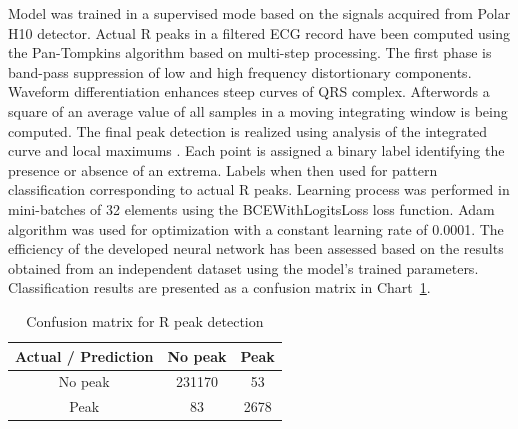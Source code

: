 \documentclass[journal]{IEEEtran}
\begin{document}
Model was trained in a supervised mode based on the signals acquired from Polar H10 detector. Actual R peaks in a filtered ECG record have been computed using the Pan-Tompkins algorithm based on multi-step processing. The first phase is band-pass suppression of low and high frequency distortionary components. Waveform differentiation enhances steep curves of QRS complex. Afterwords a square of an average value of all samples in a moving integrating window is being computed. The final peak detection is realized using analysis of the integrated curve and local maximums \cite{27}.
Each point is assigned a binary label identifying the presence or absence of an extrema. Labels when then used for pattern classification corresponding to actual R peaks.
\newpage
Learning process was performed in mini-batches of 32 elements using the BCEWithLogitsLoss loss function. Adam algorithm was used for optimization with a constant learning rate of 0.0001. The efficiency of the developed neural network has been assessed based on the results obtained from an independent dataset using the model's trained parameters. Classification results are presented as a confusion matrix in Chart~\ref{tab:conf_matrix}.


\begin{table}[ht]
\centering
\caption{Confusion matrix for R peak detection}
\label{tab:conf_matrix}
\begin{tabular}{|c|c|c|}
\hline
\textbf{Actual / Prediction} & \textbf{No peak } & \textbf{Peak } \\
\hline
No peak  & 231170 & 53 \\
Peak  & 83 & 2678 \\
\hline
\end{tabular}
\end{table}
\end{document}
